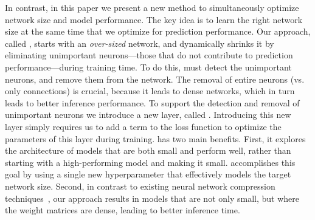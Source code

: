 In contrast, in this paper we present a new method to simultaneously optimize
 network size and model performance. The key idea is to learn the right
network size at the same time that we optimize for prediction performance. 
Our approach, called \shrink, starts with an {\it
over-sized} network, and dynamically shrinks it by eliminating unimportant
neurons---those that do not contribute to prediction performance---during
training time. To do this, \shrink must detect the unimportant neurons, and
remove them from the network. The
removal of entire neurons (vs. only connections) is crucial, because it leads to
dense networks, which in turn leads to better inference performance. To support the
detection and removal of unimportant neurons we introduce a new layer, called
\swl. Introducing this new layer simply requires us to
add a term to the
loss function to optimize the parameters of this layer during training. 
\shrink has
two main benefits. First, it explores the architecture of models that are both
small and perform well, rather than starting with a high-performing model and
making it small.  \shrink accomplishes this goal by using a single new 
hyperparameter that effectively models the target network size.  
Second, in contrast to existing neural
network compression techniques~\cite{Aghasi2016,han2015deepcompression}, our
approach results in models that are not only small, but where the weight matrices
are dense, leading to better inference time.



